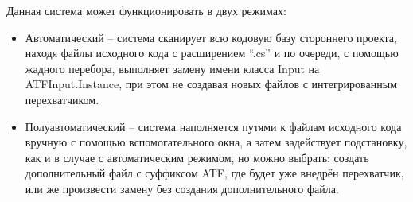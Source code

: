 Данная система может функционировать в двух режимах:
\begin{itemize}
	\item Автоматический -- система сканирует всю кодовую базу стороннего проекта, находя файлы исходного кода с расширением ``.cs'' и по очереди, с помощью жадного перебора, выполняет замену имени класса Input на ATFInput.Instance, при этом не создавая новых файлов с интегрированным перехватчиком.
	\item Полуавтоматический -- система наполняется путями к файлам исходного кода вручную с помощью вспомогательного окна, а затем задействует подстановку, как и в случае с автоматическим режимом, но можно выбрать: создать дополнительный файл с суффиксом ATF, где будет уже внедрён перехватчик, или же произвести замену без создания дополнительного файла.
\end{itemize}
